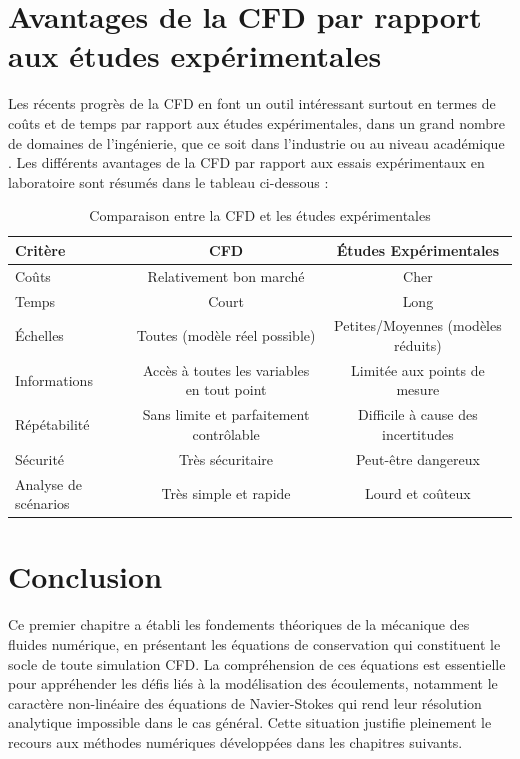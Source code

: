 \section{Avantages de la CFD par rapport aux études expérimentales}
\label{sec:avantages_cfd}

Les récents progrès de la CFD en font un outil intéressant surtout en termes de coûts et de temps par rapport aux études expérimentales, dans un grand nombre de domaines de l'ingénierie, que ce soit dans l'industrie ou au niveau académique \cite{wendt2009computational}. Les différents avantages de la CFD par rapport aux essais expérimentaux en laboratoire sont résumés dans le tableau ci-dessous : \cite{roychowdhury2020computational}

\begin{table}[H]
    \centering
    \caption{Comparaison entre la CFD et les études expérimentales}
    \label{tab:comparaison_cfd_exp}
    \begin{tabular}{|l|c|c|}
        \hline
        \textbf{Critère} & \textbf{CFD} & \textbf{Études Expérimentales} \\
        \hline
        Coûts & Relativement bon marché & Cher \\
        \hline
        Temps & Court & Long \\
        \hline
        Échelles & Toutes (modèle réel possible) & Petites/Moyennes (modèles réduits) \\
        \hline
        Informations & Accès à toutes les variables en tout point & Limitée aux points de mesure \\
        \hline
        Répétabilité & Sans limite et parfaitement contrôlable & Difficile à cause des incertitudes \\
        \hline
        Sécurité & Très sécuritaire & Peut-être dangereux \\
        \hline
        Analyse de scénarios & Très simple et rapide & Lourd et coûteux \\
        \hline
    \end{tabular}
\end{table}

\section{Conclusion}
\label{sec:conclusion_chap1}

Ce premier chapitre a établi les fondements théoriques de la mécanique des fluides numérique, en présentant les équations de conservation qui constituent le socle de toute simulation CFD. La compréhension de ces équations est essentielle pour appréhender les défis liés à la modélisation des écoulements, notamment le caractère non-linéaire des équations de Navier-Stokes qui rend leur résolution analytique impossible dans le cas général. Cette situation justifie pleinement le recours aux méthodes numériques développées dans les chapitres suivants.